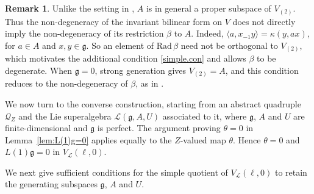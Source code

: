 \documentclass[12pt]{article}
\numberwithin{equation}{section}
\theoremstyle{definition}
\newtheorem{remark}[theorem]{Remark}
\theoremstyle{plain}
\newcommand{\Rad}{\mathrm{Rad }}
\newcommand{\fg}{\mathfrak{g}}
\newcommand{\cQ}{\ensuremath{\mathcal{Q}}}
\newcommand{\cL}{\ensuremath{\mathcal{L}}}
\begin{document}
\begin{remark}\label{rmk:deg.form}
    Unlike the setting in \cite[Corollary~3.22]{LY}, $A$ is in general a proper subspace of $V_{(2)}$. Thus the non-degeneracy of the invariant bilinear form on $V$ does not directly imply the non-degeneracy of its restriction $\beta$ to $A$. Indeed, $\langle a,x_{-1}y\rangle=\kappa(y,ax)$, for $a\in A$ and $x,y\in\fg$. So an element of $\Rad\,\beta$ need not be orthogonal to $V_{(2)}$, which motivates the additional condition \eqref{simple.con} and allows $\beta$ to be degenerate. When $\fg=0$, strong generation gives $V_{(2)}=A$, and this condition reduces to the non-degeneracy of $\beta$, as in \cite{LY}.
\end{remark}

We now turn to the converse construction, starting from an abstract quadruple $\cQ_Z$ and the Lie superalgebra $\cL(\fg,A,U)$ associated to it, where $\fg$, $A$ and $U$ are finite-dimensional and $\fg$ is perfect. The argument proving $\theta=0$ in Lemma~\ref{lem:L(1)g=0} applies equally to the $Z$-valued map $\theta$. Hence $\theta=0$ and $L(1)\fg=0$ in $V_\cL(\ell,0)$.

We next give sufficient conditions for the simple quotient of $V_\cL(\ell,0)$ to retain the generating subspaces $\fg$, $A$ and $U$.
\end{document}
